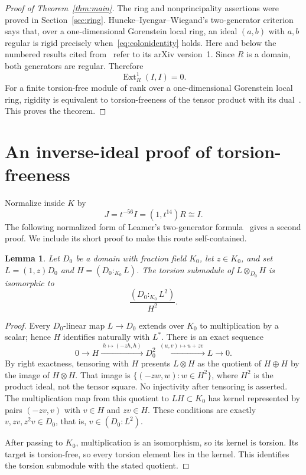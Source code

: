\documentclass[11pt,letterpaper]{article}
\newtheorem{lemma}[theorem]{Lemma}
\theoremstyle{remark}
\newcommand{\Ext}{\operatorname{Ext}}
\numberwithin{equation}{section}
\begin{document}
\begin{proof}[Proof of Theorem~\ref{thm:main}]
The ring and nonprincipality assertions were proved in Section~\ref{sec:ring}. Huneke--Iyengar--Wiegand's two-generator criterion~\cite[Corollary~5.7]{HIW} says that, over a one-dimensional Gorenstein local ring, an ideal $(a,b)$ with $a,b$ regular is rigid precisely when~\eqref{eq:colonidentity} holds. Here and below the numbered results cited from~\cite{HIW} refer to its arXiv version~1. Since $R$ is a domain, both generators are regular. Therefore
\[
 \Ext_R^1(I,I)=0.
\]
For a finite torsion-free module of rank over a one-dimensional Gorenstein local ring, rigidity is equivalent to torsion-freeness of the tensor product with its dual~\cite[Proposition~5.1]{HIW}. This proves the theorem.
\end{proof}

\section{An inverse-ideal proof of torsion-freeness}\label{sec:inverse}
Normalize inside $K$ by
\[
 J=t^{-56}I=(1,t^{14})R\cong I.
\]
The following normalized form of Leamer's two-generator formula~\cite[Lemma~1.9]{Leamer} gives a second proof. We include its short proof to make this route self-contained.

\begin{lemma}\label{lem:Leamer}
Let $D_0$ be a domain with fraction field $K_0$, let $z\in K_0$, and set $L=(1,z)D_0$ and $H=(D_0:_{K_0}L)$. The torsion submodule of $L\otimes_{D_0}H$ is isomorphic to
\[
 \frac{(D_0:_{K_0}L^2)}{H^2}.
\]
\end{lemma}
\begin{proof}
Every $D_0$-linear map $L\to D_0$ extends over $K_0$ to multiplication by a scalar; hence $H$ identifies naturally with $L^*$. There is an exact sequence
\[
 0\longrightarrow H\xrightarrow{\;h\mapsto(-zh,h)\;}D_0^2
 \xrightarrow{\;(u,v)\mapsto u+zv\;}L\longrightarrow0.
\]
By right exactness, tensoring with $H$ presents $L\otimes H$ as the quotient of $H\oplus H$ by the image of $H\otimes H$. That image is $\{(-zw,w):w\in H^2\}$, where $H^2$ is the product ideal, not the tensor square. No injectivity after tensoring is asserted. The multiplication map from this quotient to $LH\subset K_0$ has kernel represented by pairs $(-zv,v)$ with $v\in H$ and $zv\in H$. These conditions are exactly $v,zv,z^2v\in D_0$, that is, $v\in(D_0:L^2)$.

After passing to $K_0$, multiplication is an isomorphism, so its kernel is torsion. Its target is torsion-free, so every torsion element lies in the kernel. This identifies the torsion submodule with the stated quotient.
\end{proof}
\end{document}
